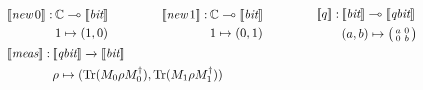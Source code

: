 \begin{figure}[H]
  \begin{equation*}
  \begin{split}
  \begin{aligned}
  &
  \hspace{0pt}
  \begin{minipage}[t]{0.45\textwidth}
  $\begin{aligned}
    [\![\textit{new} \, 0 ]\!] : \hspace{2pt}& \mathbb{C} \multimap \llbracket \textit{bit} \rrbracket  \\
  & 1 \mapsto (1,0)
  \end{aligned}$
  \end{minipage}
  \hspace{-30pt}
  \begin{minipage}[t]{0.45\textwidth}
  $\begin{aligned}
    [\![\textit{new} \, 1 ]\!] :\hspace{2pt}& \mathbb{C} \multimap \llbracket \textit{bit} \rrbracket  \\
    & 1 \mapsto (0,1)
  \end{aligned}$
  \end{minipage} 
  \hspace{-30pt}
  \begin{minipage}[t]{0.45\textwidth}
  $\begin{aligned}
    [\![q ]\!] : \hspace{2pt}&\llbracket \textit{bit} \rrbracket \multimap \llbracket \textit{qbit} \rrbracket\\
     &(a,b) \mapsto \big(\begin{smallmatrix}
    a & 0\\
    0 & b
  \end{smallmatrix}\big) 
  \end{aligned}$
  \end{minipage} \\
  &
  \hspace{0pt}
  \begin{minipage}[t]{0.45\textwidth}
  $\begin{aligned}
    [\![\textit{meas}]\!]:\hspace{2pt} & \llbracket \textit{qbit} \rrbracket \xrightarrow{} \llbracket \textit{bit} \rrbracket  \\
    &\rho \mapsto ( \text{Tr} (M_{0} \rho M_{0}^{\dag}), \text{Tr} (M_{1} \rho M_{1}^{\dag})) 
  \end{aligned}$
  \end{minipage} 

\end{aligned}
\end{split}
\end{equation*}
\end{figure}
